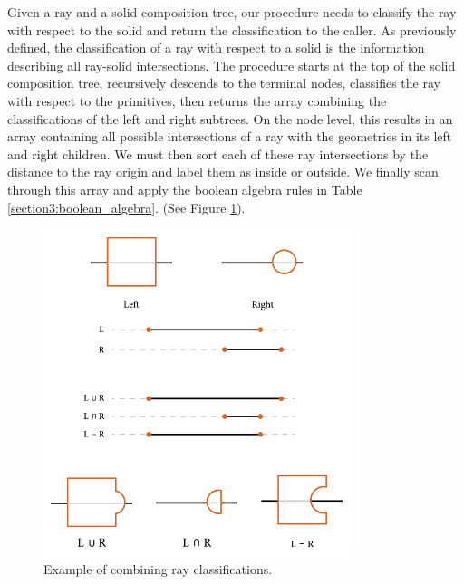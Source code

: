 \documentclass[a4paper,11pt,oneside]{article}
\begin{document}
Given a ray and a solid composition tree, our procedure needs to classify the ray with respect to the solid and return the classification to the caller. As previously defined, the classification of a ray with respect to a solid is the information describing all ray-solid intersections. The procedure starts at the top of the solid composition tree, recursively descends to the terminal nodes, classifies the ray with respect to the primitives, then returns the array combining the classifications of the left and right subtrees. On the node level, this results in an array containing all possible intersections of a ray with the geometries in its left and right children. We must then sort each of these ray intersections by the distance to the ray origin and label them as inside or outside. We finally scan through this array and apply the boolean algebra rules in Table \ref{section3:boolean_algebra}. (See Figure \ref{sec3.3:classification}).
\begin{figure}[ht]
	\begin{center}
		\includegraphics[width=0.8\textwidth]{section3/3.3/ray-classifications.png}
	\end{center}
	\caption{Example of combining ray classifications.}
	\label{sec3.3:classification}
\end{figure}
\end{document}
